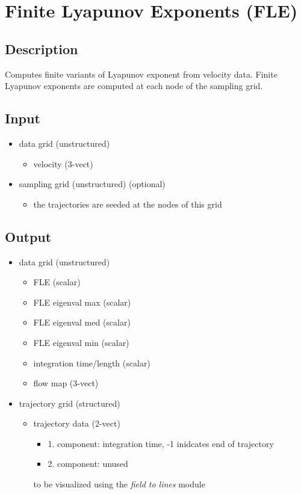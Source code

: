 \section{Finite Lyapunov Exponents (FLE)}
\label{sec:FLE}


\subsection{Description}
Computes finite variants of Lyapunov exponent from velocity data. Finite Lyapunov exponents are computed at each node of the sampling grid.


\subsection{Input}
\begin{itemize}
\item
  data grid (unstructured)
  \begin{itemize}
  \item
    velocity (3-vect)
  \end{itemize}
\item
  sampling grid (unstructured) (optional)
  \begin{itemize}
  \item
    the trajectories are seeded at the nodes of this grid
  \end{itemize}
\end{itemize}


\subsection{Output}
\begin{itemize}
\item
  data grid (unstructured)
  \begin{itemize}
  \item
    FLE (scalar)
  \item
    FLE eigenval max (scalar)
  \item
    FLE eigenval med (scalar)
  \item
    FLE eigenval min (scalar)
  \item
    integration time/length (scalar)
  \item
    flow map (3-vect)
  \end{itemize}
\item
  trajectory grid (structured)
  \begin{itemize}
  \item
    trajectory data (2-vect)
    \begin{itemize}
    \item
      1. component: integration time, -1 inidcates end of trajectory
    \item
      2. component: unused
    \end{itemize}
    to be visualized using the \emph{field to lines} module
  \end{itemize}
\end{itemize}


